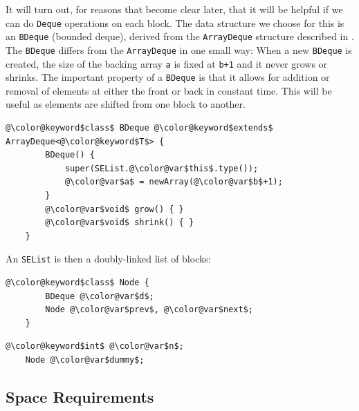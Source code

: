 It will turn out, for reasons that become clear later, that it will
be helpful if we can do \mbox{\texttt{Deque}} operations on each block.  The data
structure we choose for this is an \mbox{\texttt{BDeque}} (bounded deque), derived
from the \mbox{\texttt{ArrayDeque}} structure described in .
The \mbox{\texttt{BDeque}} differs from the \mbox{\texttt{ArrayDeque}} in one small way: When a
new \mbox{\texttt{BDeque}} is created, the size of the backing array \mbox{\texttt{{\color{var}a}}}
is fixed at \mbox{\texttt{{\color{var}b}+1}} and it never grows or shrinks.
The important property of a \mbox{\texttt{BDeque}} is that it allows for addition or
removal of elements at either the front or back in constant time. This
will be useful as elements are shifted from one block to another.


\begin{Verbatim}[tabsize=2,frame=single,commandchars=\\@\$,label=\texttt{SEList},labelposition=topline]
	@\color@keyword$class$ BDeque @\color@keyword$extends$ ArrayDeque<@\color@keyword$T$> {
		BDeque() {
			super(SEList.@\color@var$this$.type());
			@\color@var$a$ = newArray(@\color@var$b$+1);
		}
		@\color@var$void$ grow() { }
		@\color@var$void$ shrink() { }
	}
\end{Verbatim}

An \mbox{\texttt{SEList}} is then a doubly-linked list of blocks:

\begin{Verbatim}[tabsize=2,frame=single,commandchars=\\@\$,label=\texttt{SEList},labelposition=topline]
	@\color@keyword$class$ Node {
		BDeque @\color@var$d$;
		Node @\color@var$prev$, @\color@var$next$;
	}
\end{Verbatim}
\begin{Verbatim}[tabsize=2,frame=single,commandchars=\\@\$,label=\texttt{SEList},labelposition=topline]
	@\color@keyword$int$ @\color@var$n$;
	Node @\color@var$dummy$;
\end{Verbatim}

\subsection{Space Requirements}

